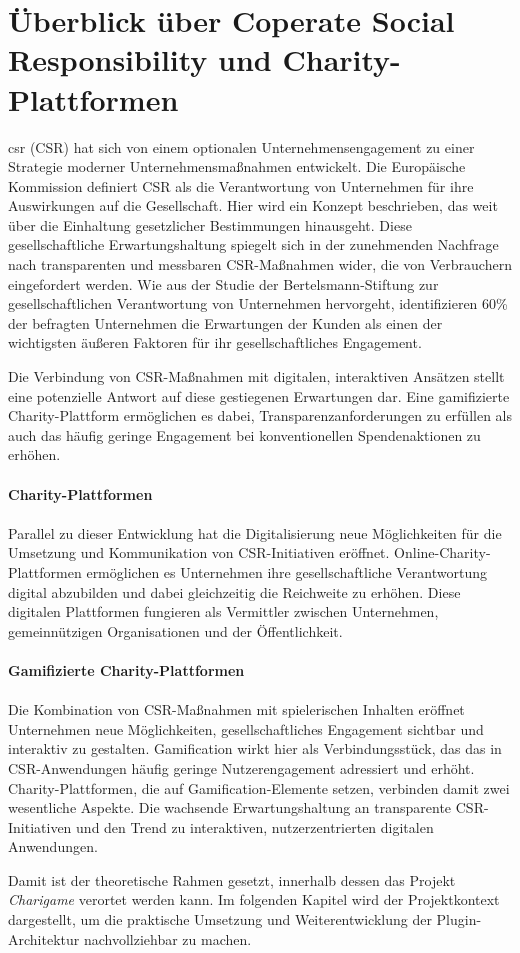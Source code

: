 \section{Überblick über Coperate Social Responsibility und Charity-Plattformen}
\gls{csr} (CSR) hat sich von einem optionalen Unternehmensengagement zu einer Strategie moderner Unternehmensmaßnahmen entwickelt.
Die Europäische Kommission definiert CSR als die Verantwortung von Unternehmen für ihre Auswirkungen auf die Gesellschaft.
Hier wird ein Konzept beschrieben, das weit über die Einhaltung gesetzlicher Bestimmungen hinausgeht.\cite{european_commission2011csr}
Diese gesellschaftliche Erwartungshaltung spiegelt sich in der zunehmenden Nachfrage nach transparenten und messbaren CSR-Maßnahmen wider, die von Verbrauchern eingefordert werden.
Wie aus der Studie der Bertelsmann-Stiftung zur gesellschaftlichen Verantwortung von Unternehmen hervorgeht, identifizieren 60\% der befragten Unternehmen die Erwartungen der Kunden als einen der wichtigsten äußeren Faktoren für ihr gesellschaftliches Engagement.\cite{bertelsmann2006gesellschaftliche}

Die Verbindung von CSR-Maßnahmen mit digitalen, interaktiven Ansätzen stellt eine potenzielle Antwort auf diese gestiegenen Erwartungen dar.
Eine gamifizierte Charity-Plattform ermöglichen es dabei, Transparenzanforderungen zu erfüllen als auch das häufig geringe Engagement bei konventionellen Spendenaktionen zu erhöhen.
\\\\
\textbf{Charity-Plattformen}
\\\\
Parallel zu dieser Entwicklung hat die Digitalisierung neue Möglichkeiten für die Umsetzung und Kommunikation von CSR-Initiativen eröffnet.
Online-Charity-Plattformen ermöglichen es Unternehmen ihre gesellschaftliche Verantwortung digital abzubilden und dabei gleichzeitig die Reichweite zu erhöhen.
Diese digitalen Plattformen fungieren als Vermittler zwischen Unternehmen, gemeinnützigen Organisationen und der Öffentlichkeit.
\\\\
\textbf{Gamifizierte Charity-Plattformen} \\\\
Die Kombination von CSR-Maßnahmen mit spielerischen Inhalten eröffnet Unternehmen neue Möglichkeiten, gesellschaftliches Engagement sichtbar und interaktiv zu gestalten.
Gamification wirkt hier als Verbindungsstück, das das in CSR-Anwendungen häufig geringe Nutzerengagement adressiert und erhöht.
Charity-Plattformen, die auf Gamification-Elemente setzen, verbinden damit zwei wesentliche Aspekte.
Die wachsende Erwartungshaltung an transparente CSR-Initiativen und den Trend zu interaktiven, nutzerzentrierten digitalen Anwendungen.

Damit ist der theoretische Rahmen gesetzt, innerhalb dessen das Projekt \textit{Charigame} verortet werden kann.
Im folgenden Kapitel wird der Projektkontext dargestellt, um die praktische Umsetzung und Weiterentwicklung der \gls{Plugin}-Architektur nachvollziehbar zu machen.